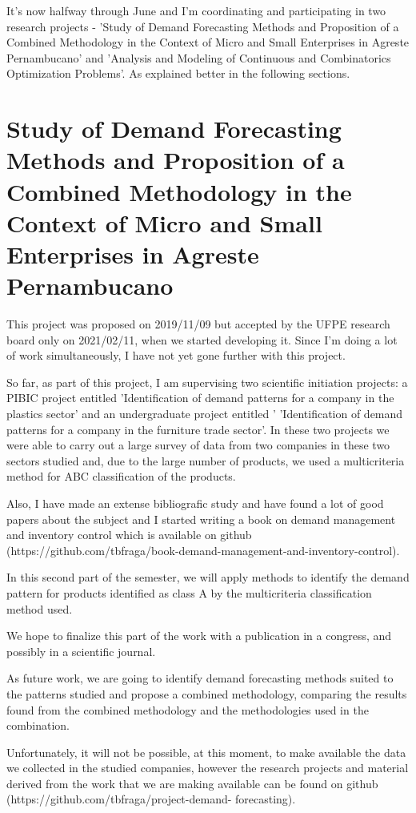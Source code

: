 \documentclass[11pt,latterpaper,twocolumn]{article}
\begin{document}
It's now halfway through June and I'm coordinating and participating in two research projects - 'Study of Demand Forecasting Methods and Proposition of a Combined Methodology in the Context of Micro and Small Enterprises in Agreste Pernambucano' and 'Analysis and Modeling of Continuous and Combinatorics Optimization Problems'. As explained better in the following sections.

\section{Study of Demand Forecasting Methods and Proposition of a Combined Methodology in the Context of Micro and Small Enterprises in Agreste Pernambucano}

This project was proposed on 2019/11/09 but accepted by the UFPE research board only on 2021/02/11, when we started developing it. Since I'm doing a lot of work simultaneously, I have not yet gone further with this project.

So far, as part of this project, I am supervising two scientific initiation projects: a PIBIC project entitled 'Identification of demand patterns for a company in the plastics sector' and an undergraduate project entitled ' 'Identification of demand patterns for a company in the furniture trade sector'. In these two projects we were able to carry out a large survey of data from two companies in these two sectors studied and, due to the large number of products, we used a multicriteria method for ABC classification of the products.

Also, I have made an extense bibliografic study and have found a lot of good papers about the subject and I started writing a book on demand management and inventory control which is available on github (https://github.com/tbfraga/book-demand-management-and-inventory-control).

In this second part of the semester, we will apply methods to identify the demand pattern for products identified as class A by the multicriteria classification method used.

We hope to finalize this part of the work with a publication in a congress, and possibly in a scientific journal.

As future work, we are going to identify demand forecasting methods suited to the patterns studied and propose a combined methodology, comparing the results found from the combined methodology and the methodologies used in the combination.

Unfortunately, it will not be possible, at this moment, to make available the data we collected in the studied companies, however the research projects and material derived from the work that we are making available can be found on github (https://github.com/tbfraga/project-demand- forecasting).
\end{document}
